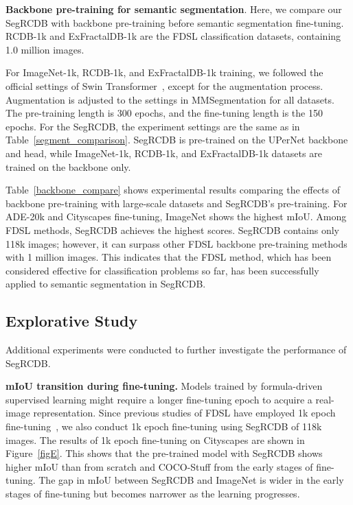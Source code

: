 \documentclass[10pt,twocolumn,letterpaper]{article}
\begin{document}
\noindent \textbf{Backbone pre-training for semantic segmentation}.
Here, we compare our SegRCDB with backbone pre-training before semantic segmentation fine-tuning. RCDB-1k and ExFractalDB-1k are the FDSL classification datasets, containing 1.0 million images.

For ImageNet-1k, RCDB-1k, and ExFractalDB-1k training, we followed the official settings of Swin Transformer~\cite{liu2021Swin}, except for the augmentation process. Augmentation is adjusted to the settings in MMSegmentation for all datasets. The pre-training length is 300 epochs, and the fine-tuning length is the 150 epochs. For the SegRCDB, the experiment settings are the same as in Table~\ref{segment_comparison}. SegRCDB is pre-trained on the UPerNet backbone and head, while ImageNet-1k, RCDB-1k, and ExFractalDB-1k datasets are trained on the backbone only.

Table~\ref{backbone_compare} shows experimental results comparing the effects of backbone pre-training with large-scale datasets and SegRCDB's pre-training. For ADE-20k and Cityscapes fine-tuning, ImageNet shows the highest mIoU. Among FDSL methods, SegRCDB achieves the highest scores. SegRCDB contains only 118k images; however, it can surpass other FDSL backbone pre-training methods with 1 million images. 
This indicates that the FDSL method, which has been considered effective for classification problems so far, has been successfully applied to semantic segmentation in SegRCDB.

\subsection{Explorative Study}
\label{sec:expolarative}
Additional experiments were conducted to further investigate the performance of SegRCDB. 

\noindent \textbf{mIoU transition during fine-tuning.}
\figE
Models trained by formula-driven supervised learning might require a longer fine-tuning epoch to acquire a real-image representation. Since previous studies of FDSL have employed 1k epoch fine-tuning~\cite{Kataoka_2022_CVPR, nakashima2022can},  we also conduct 1k epoch fine-tuning using SegRCDB of 118k images.
The results of 1k epoch fine-tuning on Cityscapes are shown in Figure~\ref{figE}. This shows that the pre-trained model with SegRCDB shows higher mIoU than from scratch and COCO-Stuff from the early stages of fine-tuning. The gap in mIoU between SegRCDB and ImageNet is wider in the early stages of fine-tuning but becomes narrower as the learning progresses.
\end{document}

